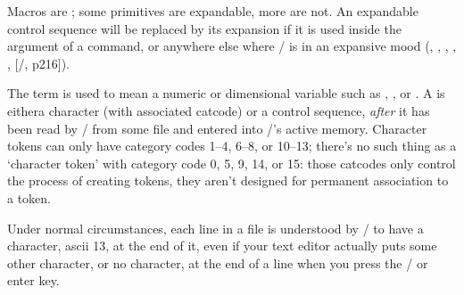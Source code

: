 Macros are ; some primitives are
expandable, more are not. An expandable control
sequence will be replaced by its expansion if it is used inside the
argument of a  command, or anywhere else where \tex/ is
in an expansive mood (, , ,
, ,  [\texbook/, p216]).

The term  is used to mean a numeric or dimensional
variable such as , , or . A
 is eithera character (with associated catcode) or a control
sequence, {\em after\/} it has been read by \tex/ from some file and
entered into \tex/'s active memory. Character tokens can only have
category codes 1--4, 6--8, or 10--13; there's no such thing as a
`character token' with category code 0, 5, 9, 14, or 15: those catcodes
only control the process of creating tokens, they aren't designed for
permanent association to a token.

Under normal circumstances, each line in a file is understood by
\tex/ to have a  character, {\sc ascii} 13, at the end of it,
even if your text editor actually puts some other character, or
no character, at the end of a line when you press the \return/ or
{\sc enter} key.

